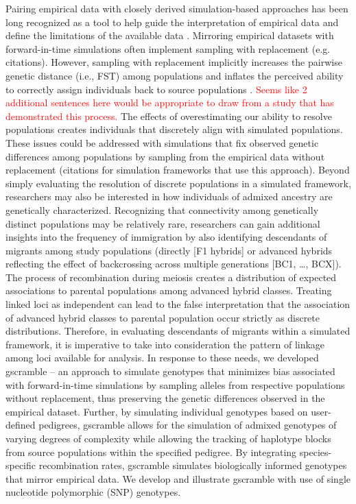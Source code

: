 Pairing empirical data with closely derived simulation-based approaches has been long recognized as a tool to help guide the interpretation of empirical data and define the limitations of the available data \citep{vaha2006efficiency,anderson2008improved,latch2011fine}.  Mirroring empirical datasets with forward-in-time simulations often implement sampling with replacement (e.g. citations).  However, sampling with replacement implicitly increases the pairwise genetic distance (i.e., FST) among populations and inflates the perceived ability to correctly assign individuals back to source populations \cite{almudevar2000exact,anderson2008improved}.  \textcolor{red}{Seems like 2 additional sentences here would be appropriate to draw from a study that has demonstrated this process.}  The effects of overestimating our ability to resolve populations creates individuals that discretely align with simulated populations.  These issues could be addressed with simulations that fix observed genetic differences among populations by sampling from the empirical data without replacement (citations for simulation frameworks that use this approach).
  Beyond simply evaluating the resolution of discrete populations in a simulated framework, researchers may also be interested in how individuals of admixed ancestry are genetically characterized.  Recognizing that connectivity among genetically distinct populations may be relatively rare, researchers can gain additional insights into the frequency of immigration by also identifying descendants of migrants among study populations (directly [F1 hybrids] or advanced hybrids reflecting the effect of backcrossing across multiple generations [BC1, \ldots, BCX]).  The process of recombination during meiosis creates a distribution of expected associations to parental populations among advanced hybrid classes. Treating linked loci as independent can lead to the false interpretation that the association of advanced hybrid classes to parental population occur strictly as discrete distributions.  Therefore, in evaluating descendants of migrants within a simulated framework, it is imperative to take into consideration the pattern of linkage among loci available for analysis.
	In response to these needs, we developed gscramble – an approach to simulate genotypes that minimizes bias associated with forward-in-time simulations by sampling alleles from respective populations without replacement, thus preserving the genetic differences observed in the empirical dataset.  Further, by simulating individual genotypes based on user-defined pedigrees, gscramble allows for the simulation of admixed genotypes of varying degrees of complexity while allowing the tracking of haplotype blocks from source populations within the specified pedigree.  By integrating species-specific recombination rates, gscramble simulates biologically informed genotypes that mirror empirical data.  We develop and illustrate gscramble with use of single nucleotide polymorphic (SNP) genotypes.


